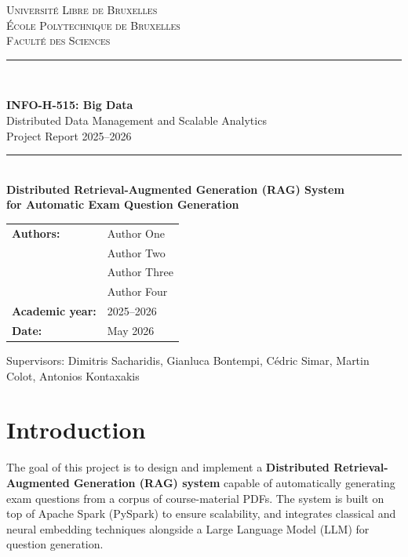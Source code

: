 \documentclass[a4paper,11pt]{article}
\begin{document}
\begin{titlepage}
  \centering
  \vspace*{2cm}
  {\Large \textsc{Université Libre de Bruxelles}\\[0.3em]
   \textsc{École Polytechnique de Bruxelles}\\[0.3em]
   \textsc{Faculté des Sciences}\par}
  \vspace{1.5cm}
  \rule{\linewidth}{0.5pt}\\[0.4cm]
  {\LARGE \textbf{INFO-H-515: Big Data}\\[0.3em]
   Distributed Data Management and Scalable Analytics\\[0.3em]
   \large Project Report 2025–2026\par}
  \rule{\linewidth}{0.5pt}\\[1.5cm]

  {\large \textbf{Distributed Retrieval-Augmented Generation (RAG) System\\
  for Automatic Exam Question Generation}}\\[2cm]

  \begin{tabular}{ll}
    \textbf{Authors:} & Author One \\
                      & Author Two \\
                      & Author Three \\
                      & Author Four \\[1em]
    \textbf{Academic year:} & 2025–2026 \\
    \textbf{Date:}          & May 2026 \\
  \end{tabular}

  \vfill
  {\small Supervisors: Dimitris Sacharidis, Gianluca Bontempi, Cédric Simar,
  Martin Colot, Antonios Kontaxakis}
\end{titlepage}

\tableofcontents
\newpage

\section{Introduction}

The goal of this project is to design and implement a \textbf{Distributed
Retrieval-Augmented Generation (RAG) system} capable of automatically
generating exam questions from a corpus of course-material PDFs.
The system is built on top of Apache Spark (PySpark) to ensure scalability,
and integrates classical and neural embedding techniques alongside a Large
Language Model (LLM) for question generation.
\end{document}
